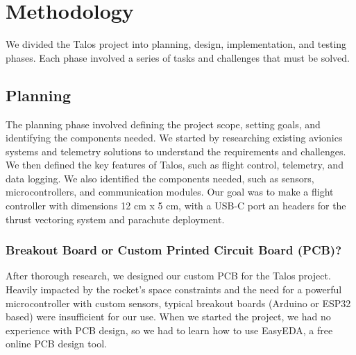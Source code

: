 \documentclass{article}
\begin{document}
\section{Methodology}

\qquad We divided the Talos project into planning, design, implementation, and testing phases. Each phase involved a series of tasks and challenges that must be solved.

\subsection{Planning}

\qquad The planning phase involved defining the project scope, setting goals, and identifying the components needed. We started by researching existing avionics systems and telemetry solutions to understand the requirements and challenges. We then defined the key features of Talos, such as flight control, telemetry, and data logging. We also identified the components needed, such as sensors, microcontrollers, and communication modules. Our goal was to make a flight controller with dimensions 12 cm x 5 cm, with a USB-C port an headers for the thrust vectoring system and parachute deployment.
\subsubsection{Breakout Board or Custom Printed Circuit Board (PCB)?}
\qquad After thorough research, we designed our custom PCB for the Talos project. Heavily impacted by the rocket's space constraints and the need for a powerful microcontroller with custom sensors, typical breakout boards (Arduino or ESP32 based) were insufficient for our use. When we started the project, we had no experience with PCB design, so we had to learn how to use EasyEDA, a free online PCB design tool.
\end{document}
